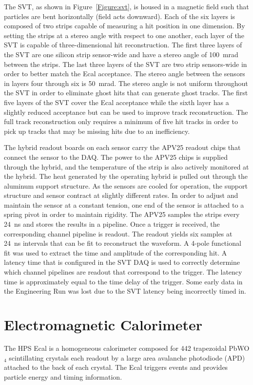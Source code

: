 \documentclass[12pt]{report}
\begin{document}
The SVT, as shown in Figure~\ref{Figure:svt}, is housed in a magnetic field such that particles are bent horizontally (field acts downward). Each of the six layers is composed of two strips capable of measuring a hit position in one dimension. By setting the strips at a stereo angle with respect to one another, each layer of the SVT is capable of three-dimensional hit reconstruction. The first three layers of the SVT are one silicon strip sensor-wide and have a stereo angle of 100~mrad between the strips. The last three layers of the SVT are two strip sensors-wide in order to better match the Ecal acceptance. The stereo angle between the sensors in layers four through six is 50~mrad. The stereo angle is not uniform throughout the SVT in order to eliminate ghost hits that can generate ghost tracks. The first five layers of the SVT cover the Ecal acceptance while the sixth layer has a slightly reduced acceptance but can be used to improve track reconstruction. The full track reconstruction only requires a minimum of five hit tracks in order to pick up tracks that may be missing hits due to an inefficiency. 

\indent The hybrid readout boards on each sensor carry the APV25 readout chips that connect the sensor to the DAQ. The power to the APV25 chips is supplied through the hybrid, and the temperature of the strip is also actively monitored at the hybrid. The heat generated by the operating hybrid is pulled out through the aluminum support structure. As the sensors are cooled for operation, the support structure and sensor contract at slightly different rates. In order to adjust and maintain the sensor at a constant tension, one end of the sensor is attached to a spring pivot in order to maintain rigidity. The APV25 samples the strips every 24~ns and stores the results in a pipeline. Once a trigger is received, the corresponding channel pipeline is readout. The readout yields six samples at 24~ns intervals that can be fit to reconstruct the waveform. A 4-pole functional fit was used to extract the time and amplitude of the corresponding hit. A latency time that is configured in the SVT DAQ is used to correctly determine which channel pipelines are readout that correspond to the trigger. The latency time is approximately equal to the time delay of the trigger. Some early data in the Engineering Run was lost due to the SVT latency being incorrectly timed in. 


\section{Electromagnetic Calorimeter}
The HPS Ecal is a homogeneous calorimeter composed for 442 trapezoidal PbWO$_4$ scintillating crystals each readout by a large area avalanche photodiode (APD) attached to the back of each crystal. The Ecal triggers events and provides particle energy and timing information. 
\end{document}
